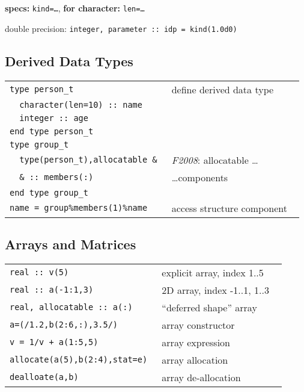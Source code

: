 \documentclass[8pt]{extarticle} %
\begin{document}
\begin{multicols}{3}
		\textbf{specs:}  {\tt kind=\dots}, \textbf{for character:} {\tt len=\dots}
		
		\vspace*{1ex}
		double precision: {\tt integer,~parameter~::~idp~=~kind(1.0d0)}
		
		\vspace*{1ex}
		\subsection{Derived Data Types}
		\begin{tabular}{L{0.55\linewidth} L{0.45\linewidth}}
			\tt type person\_t                       & define  derived data type \\
			\tt ~~character(len=10)~::~name          & \\
			\tt ~~integer~::~age                     & \\
			\tt end~type~person\_t                   & \\
			\tt type group\_t                        & \\
			\tt ~~type(person\_t),allocatable~\&     & \textit{F2008}: allocatable \dots  \\
			\tt ~~\&~::~members(:)                   & \dots components             \\
			\tt end type group\_t                    & \\
			\tt name~=~group\%members(1)\%name       & access structure component
		\end{tabular}
		
		\vspace*{1ex}
		\subsection{Arrays and Matrices}
		\begin{tabular}{L{0.55\linewidth} L{0.45\linewidth}}
			\tt real~::~v(5)                  & explicit array, index 1..5 \\
			\tt real~::~a(-1:1,3)             & 2D array, index -1..1, 1..3 \\
			\tt real,~allocatable~::~a(:)     & ``deferred shape'' array \\
			\tt a=(/1.2,b(2:6,:),3.5/)        & array constructor \\
			\tt v~=~1/v~+~a(1:5,5)            & array expression \\
			\tt allocate(a(5),b(2:4),stat=e)  & array allocation \\
			\tt dealloate(a,b)                & array de-allocation
		\end{tabular}
		

\end{multicols}
\end{document}
